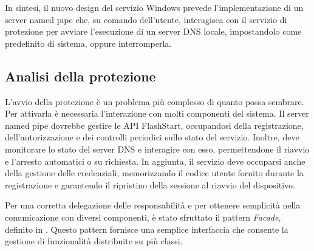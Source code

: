 \documentclass[12pt,a4paper,openright,twoside]{book}
\begin{document}
In sintesi, il nuovo design del servizio Windows prevede l'implementazione di un server named pipe che, su comando dell'utente, interagisca con il servizio di protezione per avviare l'esecuzione di un server \gls{DNS} locale, impostandolo come predefinito di sistema, oppure interromperla.

\subsection{Analisi della protezione}
\label{ssec:analisi-protezione}

L'avvio della protezione è un problema più complesso di quanto possa sembrare.
Per attivarla è necessaria l'interazione con molti componenti del sistema.
Il server named pipe dovrebbe gestire le API FlashStart, occupandosi della registrazione, dell'autorizzazione e dei controlli periodici sullo stato del servizio.
Inoltre, deve monitorare lo stato del server \gls{DNS} e interagire con esso, permettendone il riavvio e l'arresto automatici o su richiesta. 
In aggiunta, il servizio deve occuparsi anche della gestione delle credenziali, memorizzando il codice utente fornito durante la registrazione e garantendo il ripristino della sessione al riavvio del dispositivo.

Per una corretta delegazione delle responsabilità e per ottenere semplicità nella comunicazione con diversi componenti, è stato sfruttato il pattern \textit{Facade}, definito in \cite{GoF94}.
Questo pattern fornisce una semplice interfaccia che consente la gestione di funzionalità distribuite su più classi.
\end{document}

